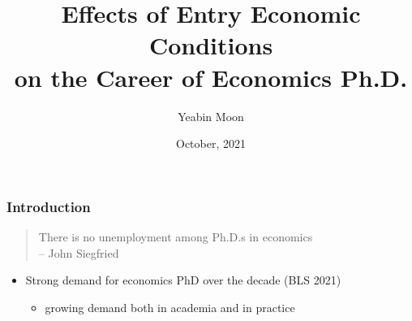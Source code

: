 \documentclass[11pt]{beamer}
\begin{document}
	\author{Yeabin Moon}
	\title{Effects of Entry Economic Conditions\\ on the Career of Economics Ph.D.}
	\date{October, 2021}
	
			\maketitle
	
	
	\begin{frame}
		\frametitle{Introduction}
				\begin{quote}
				There is no unemployment among Ph.D.s in economics {\small {\\\hfill-- John Siegfried}}
				\end{quote}
		\begin{itemize}
			\item Strong demand for economics PhD over the decade (BLS 2021)
				\begin{itemize}
					\item growing demand both in academia and in practice


\end{itemize}
\end{itemize}
\end{frame}
\end{document}
